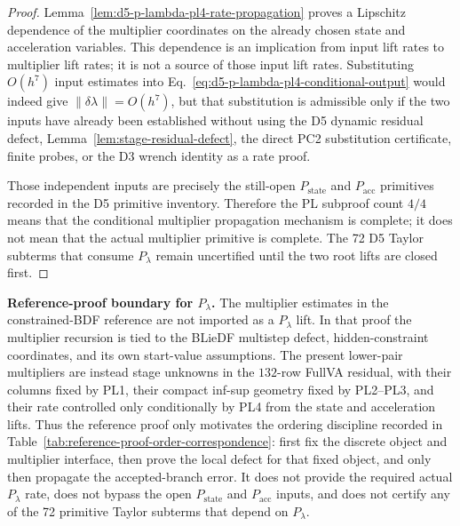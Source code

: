 \documentclass[preprint,12pt]{elsarticle}
\begin{document}
\begin{proof}
Lemma~\ref{lem:d5-p-lambda-pl4-rate-propagation} proves a Lipschitz
dependence of the multiplier coordinates on the already chosen state and
acceleration variables.  This dependence is an implication from input lift
rates to multiplier lift rates; it is not a source of those input lift rates.
Substituting \(O(h^7)\) input estimates into
Eq.~\eqref{eq:d5-p-lambda-pl4-conditional-output} would
indeed give \(\|\delta\lambda\|=O(h^7)\), but that substitution is admissible
only if the two inputs have already been established without using the D5
dynamic residual defect, Lemma~\ref{lem:stage-residual-defect}, the direct
PC2 substitution certificate, finite probes, or the D3 wrench identity as a
rate proof.

Those independent inputs are precisely the still-open
\(P_{\mathrm{state}}\) and \(P_{\mathrm{acc}}\) primitives recorded in the
D5 primitive inventory.  Therefore the PL subproof count \(4/4\) means that the
conditional multiplier propagation mechanism is complete; it does not mean
that the actual multiplier primitive is complete.  The 72 D5 Taylor subterms
that consume \(P_{\lambda}\) remain uncertified until the two root lifts are
closed first.
\end{proof}

\noindent\textbf{Reference-proof boundary for \(P_{\lambda}\).}
The multiplier estimates in the constrained-BDF reference are not imported
as a \(P_{\lambda}\) lift.  In that proof the multiplier recursion is tied to
the BLieDF multistep defect, hidden-constraint coordinates, and its own
start-value assumptions.  The present lower-pair multipliers are instead
stage unknowns in the \(132\)-row FullVA residual, with their columns fixed by
PL1, their compact inf-sup geometry fixed by PL2--PL3, and their rate
controlled only conditionally by PL4 from the state and acceleration lifts.
Thus the reference proof only motivates the ordering discipline recorded in
Table~\ref{tab:reference-proof-order-correspondence}: first fix the discrete
object and multiplier interface, then prove the local defect for that fixed
object, and only then propagate the accepted-branch error.  It does not
provide the required actual \(P_{\lambda}\) rate, does not bypass the open
\(P_{\mathrm{state}}\) and \(P_{\mathrm{acc}}\) inputs, and does not certify
any of the 72 primitive Taylor subterms that depend on \(P_{\lambda}\).
\end{document}
